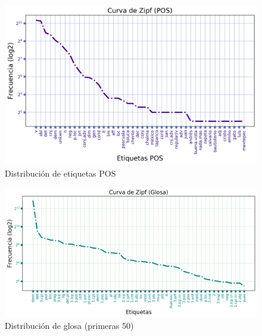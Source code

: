 \documentclass[letterpaper,12pt,oneside]{scrbook}
\theoremstyle{definition}
\begin{document}
	
	\begin{figure}[ht]

		\centering

		\includegraphics[width=\textwidth]{zipf_pos}

		\caption{Distribución de etiquetas POS}

	\end{figure}

	
	\begin{figure}[ht]

		\centering

		\includegraphics[width=\textwidth]{zipf_gloss}

		\caption{Distribución de glosa (primeras 50)}

	\end{figure}

	

	

\end{document}
